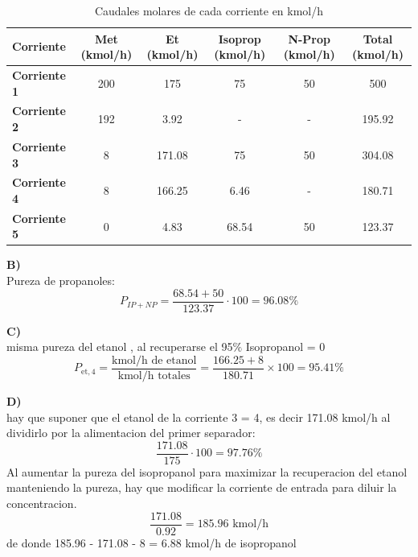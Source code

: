 \documentclass{report}
\begin{document}
\begin{table}[h]
    \centering
    \renewcommand{\arraystretch}{1.2}  %
    \begin{tabular}{lccccc}
        \toprule
        \textbf{Corriente} & \textbf{Met (kmol/h)} & \textbf{Et (kmol/h)} & \textbf{Isoprop (kmol/h)} & \textbf{N-Prop (kmol/h)}  & \textbf{Total (kmol/h)}\\
        \midrule
        \textbf{Corriente 1} & 200 & 175 & 75 & 50 & 500\\
        \textbf{Corriente 2} & 192 & 3.92 & - & - & 195.92\\
        \textbf{Corriente 3} & 8 & 171.08 & 75 & 50 & 304.08\\
        \textbf{Corriente 4} & 8 & 166.25 & 6.46 & - & 180.71\\
        \textbf{Corriente 5} & 0 & 4.83 & 68.54 & 50 & 123.37\\
        \bottomrule
    \end{tabular}
    \caption{Caudales molares de cada corriente en kmol/h}
    \label{tabla-caudales}
\end{table}
\begin{raggedright}
\textbf{B)}\\
\vspace{1\baselineskip}
Pureza de propanoles:\\
\begin{equation*}
	P_{IP + NP} = \frac{68.54 + 50}{123.37} \cdot 100 = 96.08\%
\end{equation*}

\textbf{C)}\\
\vspace{1\baselineskip}
misma pureza del etanol , al recuperarse el 95$\%$ Isopropanol = 0 
\begin{equation*}
		P_{\text{et},4} = \frac{\text{kmol/h de etanol}}{\text{kmol/h totales}} = \frac{166.25+8}{180.71} \times 100 = 95.41\%
\end{equation*}

\end{raggedright}
\vspace{2\baselineskip}
\textbf{D)}\\

\noindent hay que suponer que el etanol de la corriente 3 = 4, es decir 171.08 kmol/h al dividirlo por la alimentacion del primer separador:
\begin{equation*}
	\frac{171.08}{175} \cdot 100 = 97.76\%	
\end{equation*}
Al aumentar la pureza del isopropanol para maximizar la recuperacion del etanol manteniendo la pureza, hay que modificar la corriente de entrada para diluir la concentracion.
\begin{equation*}
	\frac{171.08}{0.92} = 185.96 \text{ kmol/h}
\end{equation*}
de donde  185.96 - 171.08 - 8 = 6.88 kmol/h de isopropanol\\
\end{document}
